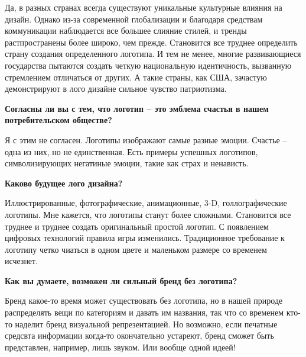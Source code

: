 Да, в разных странах всегда существуют уникальные культурные влияния на дизайн. Однако из-за современной глобализации и благодаря средствам коммуникации наблюдается все большее слияние стилей, и тренды растпространены более широко, чем прежде. Становится все труднее определить страну создания определенного логотипа. И тем не менее, многие развивающиеся государства пытаются создать четкую национальную идентичность, вызванную стремлением отличаться от других. А такие страны, как США, зачастую демонстрируют в лого дизайне  сильное чувство патриотизма.


\textbf{Согласны ли вы с тем, что логотип – это эмблема счастья в нашем потребительском обществе?}

Я с этим не согласен. Логотипы изображают самые разные эмоции. Счастье – одна из них, но не единственная. Есть примеры успешных логотипов, символизирующих негатиные эмоции, такие как страх и ненависть.

\textbf{Каково будущее лого дизайна?}

Иллюстрированные, фотографические, анимационные, 3-D, голлографические логотипы. Мне кажется, что логотипы станут более сложными. Становится все труднее и труднее создать оригинальный простой логотип. С появлением цифровых технологий правила игры изменились. Традиционное требование к логотипу четко чиаться в одном цвете и маленьком размере со временем исчезнет.

\textbf{Как вы думаете, возможен ли сильный бренд без логотипа?}

Бренд какое-то время может существовать без логотипа, но в нашей природе распределять вещи по категориям и давать им названия, так что со временем кто-то наделит бренд визуальной репрезентацией. Но возможно, если печатные средсвта информации когда-то окончательно устареют, бренд сможет быть представлен, например, лишь звуком. Или вообще одной идеей!
